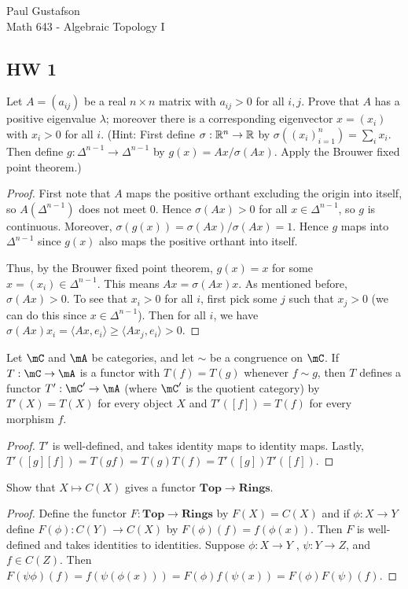 \documentclass{article}
\begin{document}
\noindent Paul Gustafson\\
\noindent Math 643 - Algebraic Topology I

\subsection*{HW 1}
 Let $A = (a_{ij})$ be a real $n \times n$ matrix with $a_{ij} > 0$ for all $i,j$. Prove that $A$ has a positive
eigenvalue $\lambda$; moreover there is a corresponding eigenvector $x = (x_i)$ with $x_i > 0$ for all $i$.
(Hint: First define $\sigma: \mathbb{R}^n \to \mathbb{R}$ by $\sigma((x_i)_{i=1}^n) = \sum_i x_i$. Then define $g: \Delta^{n-1} \to \Delta^{n-1}$
by $g(x) = Ax / \sigma(Ax)$. Apply the Brouwer fixed point theorem.)

\begin{proof}
  First note that $A$ maps the positive orthant excluding the origin into itself, so $A(\Delta^{n-1})$ does not meet $0$.  Hence
$\sigma(Ax) > 0$ for all $x \in \Delta^{n-1}$, so $g$ is continuous.
 Moreover, $\sigma(g(x)) = \sigma(Ax) / \sigma(Ax) = 1$.  Hence $g$ maps into $\Delta^{n-1}$ since $g(x)$ also maps the positive
orthant into itself.

Thus, by the Brouwer fixed point theorem, $g(x) = x$ for some $x = (x_i) \in \Delta^{n-1}$. This means $Ax = \sigma(Ax) x$. As
mentioned before, $\sigma(Ax) > 0$.  To see that $x_i > 0$ for all $i$, first pick some $j$ such that $x_j > 0$ (we can do this
since $x \in \Delta^{n-1}$). Then for all $i$, we have $\sigma(Ax) x_i = \langle Ax, e_i \rangle  \ge \langle Ax_j, e_i \rangle > 0$.
\end{proof} 

 Let $\mC$ and $\mA$ be categories, and let $\sim$ be a congruence on $\mC$. If $T: \mC \to \mA$ is a functor
with $T(f) = T(g)$ whenever $f \sim g$, then $T$ defines a functor $T': \mC' \to \mA$ (where $\mC'$ is the quotient
category) by $T'(X) = T(X)$ for every object $X$ and $T'([f]) = T(f)$ for every morphism $f$.
\begin{proof}
$T'$ is well-defined, and takes identity maps to identity maps. Lastly, $T'([g] [f]) = T(g f) = T(g) T(f) = T'([g])T'([f])$.
\end{proof}

 Show that $X \mapsto C(X)$ gives a functor  $ \mathbf{Top} \to \mathbf{Rings}$.
\begin{proof}
Define the functor $F: \mathbf{Top} \to \mathbf{Rings}$ by $F(X) = C(X)$ and if $\phi:X \to Y$
define $F(\phi): C(Y) \to C(X)$ by $F(\phi)(f) = f(\phi(x))$.  Then $F$ is well-defined and takes identities to identities.
Suppose $\phi: X\to Y$ , $\psi: Y \to Z$, and $f \in C(Z)$.  Then $F(\psi \phi)(f) = f(\psi(\phi(x))) = F(\phi) f(\psi(x)) = 
F(\phi) F(\psi) (f)$.
\end{proof}
\end{document}
